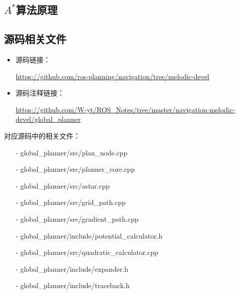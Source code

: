\documentclass[9pt, oneside]{book}
\begin{document}
\subsection{$A^*$算法原理}




\subsection{源码相关文件}

\begin{itemize}
    \item 源码链接：
    
    \url{https://github.com/ros-planning/navigation/tree/melodic-devel}

    \item 源码注释链接：
    
    \small
    \url{https://github.com/W-yt/ROS_Notes/tree/master/navigation-melodic-devel/global_planner}
    \normalsize
\end{itemize}

对应源码中的相关文件：

\begin{itemize}
    \item [-] global\_planner/src/plan\_node.cpp
    \item [-] global\_planner/src/planner\_core.cpp
    \item [-] global\_planner/src/astar.cpp
    \item [-] global\_planner/src/grid\_path.cpp
    \item [-] global\_planner/src/gradient\_path.cpp
    \item [-] global\_planner/include/potential\_calculator.h
    \item [-] global\_planner/src/quadratic\_calculator.cpp
    \item [-] global\_planner/include/expander.h
    \item [-] global\_planner/include/traceback.h
\end{itemize}
\end{document}
